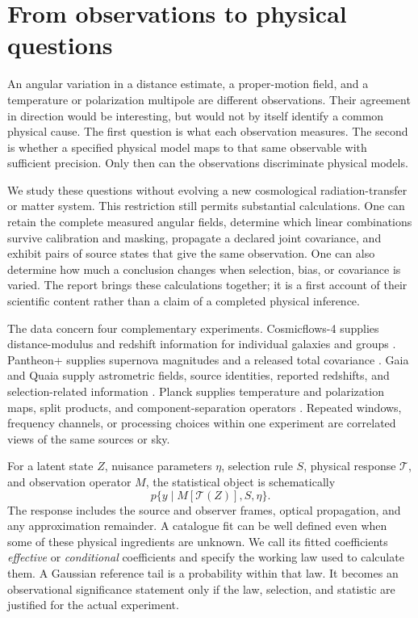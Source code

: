 \section{From observations to physical questions}
\label{sec:framework}

An angular variation in a distance estimate, a proper-motion field, and a temperature or polarization multipole are different observations. Their agreement in direction would be interesting, but would not by itself identify a common physical cause. The first question is what each observation measures. The second is whether a specified physical model maps to that same observable with sufficient precision. Only then can the observations discriminate physical models.

We study these questions without evolving a new cosmological radiation-transfer or matter system. This restriction still permits substantial calculations. One can retain the complete measured angular fields, determine which linear combinations survive calibration and masking, propagate a declared joint covariance, and exhibit pairs of source states that give the same observation. One can also determine how much a conclusion changes when selection, bias, or covariance is varied. The report brings these calculations together; it is a first account of their scientific content rather than a claim of a completed physical inference.

The data concern four complementary experiments. Cosmicflows-4 supplies distance-modulus and redshift information for individual galaxies and groups \cite{Tully2023}. Pantheon+ supplies supernova magnitudes and a released total covariance \cite{Brout2022}. Gaia and Quaia supply astrometric fields, source identities, reported redshifts, and selection-related information \cite{GaiaCRF3,Quaia2024}. Planck supplies temperature and polarization maps, split products, and component-separation operators \cite{Planck2018IV,Planck2018VII}. Repeated windows, frequency channels, or processing choices within one experiment are correlated views of the same sources or sky.

For a latent state $Z$, nuisance parameters $\eta$, selection rule $S$, physical response $\mathcal T$, and observation operator $M$, the statistical object is schematically
\begin{equation}
 p\{y\mid M[\mathcal T(Z)],S,\eta\}.
 \label{eq:observation}
\end{equation}
The response includes the source and observer frames, optical propagation, and any approximation remainder. A catalogue fit can be well defined even when some of these physical ingredients are unknown. We call its fitted coefficients \emph{effective} or \emph{conditional} coefficients and specify the working law used to calculate them. A Gaussian reference tail is a probability within that law. It becomes an observational significance statement only if the law, selection, and statistic are justified for the actual experiment.

